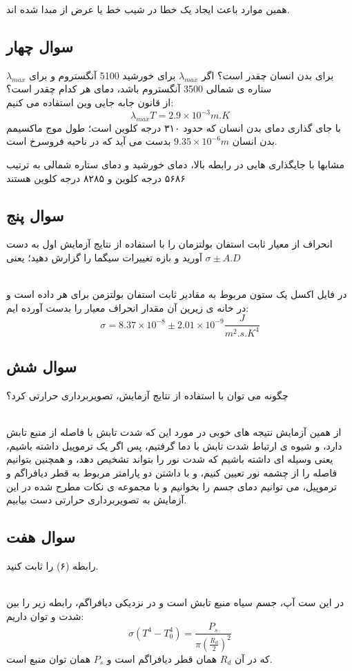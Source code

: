 \documentclass{article}
\begin{document}
 همین موارد باعث ایجاد یک خطا در شیب خط یا عرض از مبدا شده اند.

\subsection{سوال چهار}
$\lambda_{max}$
برای بدن انسان چقدر است؟ اگر 
$\lambda_{max}$
برای خورشید 5100 آنگستروم و برای ستاره ی شمالی 3500 آنگستروم باشد، دمای هر کدام چقدر است؟
\noindent\\
از قانون جابه جایی وین استفاده می کنیم:
\[
\lambda_{max}T = 2.9\times 10^{-3} m.K
\]
با جای گذاری دمای بدن انسان که حدود ۳۱۰ درجه کلوین است؛ طول موج ماکسیمم بدن انسان
$9.35\times 10^{-6} m$
بدست می آید که در ناحیه فروسرخ است.

مشابها با جایگذاری هایی در رابطه بالا، دمای خورشید و دمای ستاره شمالی به ترتیب ۵۶۸۶ درجه کلوین و ۸۲۸۵ درجه کلوین هستند
\subsection{سوال پنج}
انحراف از معیار ثابت استفان بولتزمان را با استفاده از نتایج آزمایش اول به دست آورید و بازه تغییرات سیگما را گزارش دهید؛ یعنی 
$\sigma \pm A.D$

\noindent\\
در فایل اکسل یک ستون مربوط به مقادیر ثابت استفان بولتزمن برای هر داده است و در خانه ی زیرین آن مقدار انحراف معیار را بدست آورده ایم:
\[
\sigma =  8.37 \times 10^{-8} \pm 2.01\times 10^{-9} \frac{J}{m^2 .s .  K^4} 
\]
\subsection{سوال شش}
چگونه می توان با استفاده از نتایج آزمایش، تصویربرداری حرارتی کرد؟

\noindent\\
از همین آزمایش نتیجه های خوبی در مورد این که شدت تابش با فاصله از منبع تابش دارد، و شیوه ی ارتباط شدت تابش با دما گرفتیم، پس اگر یک ترموپیل داشته باشیم، یعنی وسیله ای داشته باشیم که شدت نور را بتواند تشخیص دهد، و همچنین بتوانیم فاصله را از چشمه نور تعیین کنیم، و با داشتن دو پارامتر مربوط به قطر دیافراگم و ترموپیل، می توانیم دمای جسم را بخوانیم و با مجموعه ی نکات مطرح شده در این آزمایش به تصویربرداری حرارتی دست بیابیم.
 

\subsection{سوال هفت}
رابطه (۶) را ثابت کنید.

\noindent\\
در این ست آپ، جسم سیاه منبع تابش است و در نزدیکی دیافراگم، رابطه زیر را بین شدت و توان داریم:
\[
\sigma(T^4-T_0^4) = \frac{P_s}{\pi(\frac{R_d}2)^2}
\]
که در آن 
$R_d$
همان قطر دیافراگم است و
$P_s$
همان توان منبع است.
\end{document}
